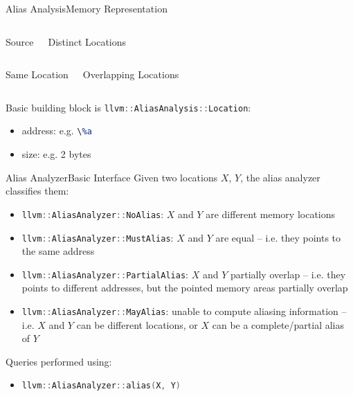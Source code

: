 \documentclass[10pt,mathserif]{beamer}
\newcommand{\cppinline}[1]{\lstinline[language=C++]!#1!}
\newcommand{\llvminput}[1]{}
\newcommand{\llvminline}[1]{\lstinline[language=LLVM]!#1!}
\begin{document}
\begin{frame}{Alias Analysis}{Memory Representation}
\begin{columns}[t]
\begin{block}{Source}
\centering
\llvminput{snippet/02/memory-locations.ll}
\end{block}

\begin{block}{Distinct Locations}
\centering

\end{block}
\end{columns}

\begin{columns}[t]
\begin{block}{Same Location}
\centering

\end{block}

\begin{block}{Overlapping Locations}
\centering

\end{block}
\end{columns}

\bigskip
Basic building block is \cppinline{llvm::AliasAnalysis::Location}:

\begin{itemize}
\item address: e.g. \llvminline{\%a}
\item size: e.g. 2 bytes
\end{itemize}
\end{frame}

\begin{frame}{Alias Analyzer}{Basic Interface}
Given two locations $X$, $Y$, the alias analyzer classifies them:

\begin{itemize}
\item \cppinline{llvm::AliasAnalyzer::NoAlias}: $X$ and $Y$ \alert{are
      different} memory locations
\vfill
\item \cppinline{llvm::AliasAnalyzer::MustAlias}: $X$ and $Y$ \alert{are equal}
      -- i.e. they points to the same address
\vfill
\item \cppinline{llvm::AliasAnalyzer::PartialAlias}: $X$ and $Y$
      \alert{partially overlap} -- i.e. they points to different addresses,
      but the pointed memory areas partially overlap
\vfill
\item \cppinline{llvm::AliasAnalyzer::MayAlias}: \alert{unable to compute}
      aliasing information -- i.e. $X$ and $Y$ can be different locations,
      or $X$ can be a complete/partial alias of $Y$
\end{itemize}

\vfill
Queries performed using:
\begin{itemize}
\item \cppinline{llvm::AliasAnalyzer::alias(X, Y)}
\end{itemize}
\end{frame}
\end{document}
